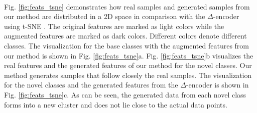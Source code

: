 \documentclass[10pt,twocolumn,letterpaper]{article}
\begin{document}
\begin{table}[!h] 
    \centering
   \\ 

    \caption{\textbf{Data Distribution analysis for different sets of features}. We augment features using our method and other data generation method based on covariance matrices \cite{feature_transfer} or the $\Delta$-encoder \cite{delta-encoder}. All methods augment features from the support set (first row). 
}
    \label{tab:dbindex_comparison}\end{table} 





Fig. \ref{fig:feats_tsne} demonstrates how real samples and generated samples from our method are distributed in a 2D space in comparison with the $\Delta$-encoder \cite{delta-encoder} using t-SNE \cite{Maaten2008VisualizingDU}. The original features are marked as light colors while the augmented features are marked as dark colors. Different colors denote different classes. The visualization for the base classes with the augmented features from our method is shown in Fig. \ref{fig:feats_tsne}a. Fig. \ref{fig:feats_tsne}b visualizes the real features and the generated features of our method for the novel classes. Our method generates samples that follow closely the real samples. The visualization for the novel classes and the generated features from the $\Delta$-encoder is shown in Fig. \ref{fig:feats_tsne}c. As can be seen, the generated data from each novel class forms into a new cluster and does not lie close to the  actual data points. 
\end{document}
